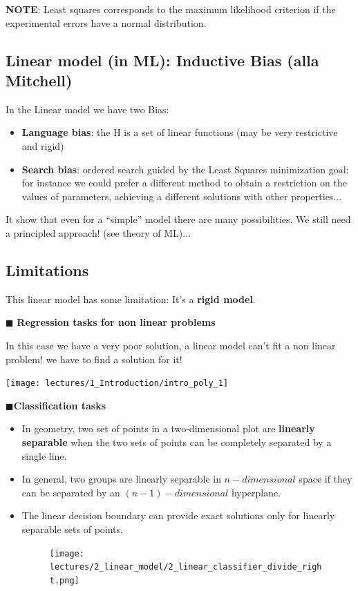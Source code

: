 \documentclass[../main.tex]{subfiles}
\begin{document}
\noindent\textbf{NOTE}: Least squares corresponds to the maximum likelihood criterion if the
experimental errors have a normal distribution.

\subsection{Linear model (in ML): Inductive Bias (alla Mitchell)}
In the Linear model we have two Bias:
\begin{itemize}
    \item \textbf{Language bias}: the H is a set of linear functions (may be very restrictive and rigid)

    \item \textbf{Search bias}: ordered search guided by the Least Squares minimization goal: for instance we could prefer a different method to obtain a restriction on the values of parameters, achieving a different solutions with other properties...

\end{itemize}

It show that even for a “simple” model there are many possibilities. We still need a principled approach! (see theory of ML)...

\subsection{Limitations}
This linear model has some limitation: It's a \textbf{rigid model}.

\noindent$\blacksquare$ \textbf{Regression tasks for non linear problems}

\begin{minipage}{0.5\textwidth}
In this case we have a very poor solution, a linear model can't fit a non linear problem! we have to find a solution for it!
\end{minipage}
\hfill
\begin{minipage}{0.5\textwidth}
\texttt{[image: lectures/1\_Introduction/intro\_poly\_1]}
\end{minipage}
\newpage

\noindent$\blacksquare$\textbf{Classification tasks}
\begin{itemize}
    \item In geometry, two set of points in a two-dimensional plot are \textbf{linearly separable} when the two sets of points can be completely separated by a single line.
    \item In general, two groups are linearly separable in $n-dimensional$ space if they can be separated by an $(n-1)-dimensional$ hyperplane.
    \item The linear decision boundary can provide exact solutions only for linearly separable sets of points.
    \begin{figure}[H]
        \centering
        \texttt{[image: lectures/2\_linear\_model/2\_linear\_classifier\_divide\_right.png]}
    \end{figure}
\end{itemize}
\end{document}
